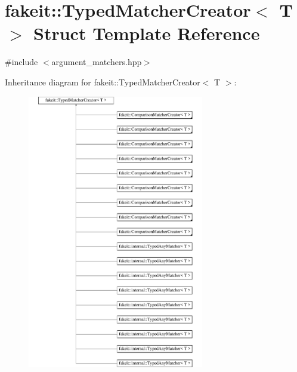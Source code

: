 \hypertarget{structfakeit_1_1TypedMatcherCreator}{}\section{fakeit\+::Typed\+Matcher\+Creator$<$ T $>$ Struct Template Reference}
\label{structfakeit_1_1TypedMatcherCreator}


{\ttfamily \#include $<$argument\+\_\+matchers.\+hpp$>$}

Inheritance diagram for fakeit\+::Typed\+Matcher\+Creator$<$ T $>$\+:\begin{figure}[H]
\begin{center}
\leavevmode
\includegraphics[height=12.000000cm]{structfakeit_1_1TypedMatcherCreator}
\end{center}
\end{figure}
